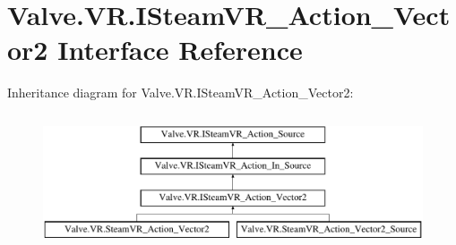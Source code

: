 \hypertarget{interface_valve_1_1_v_r_1_1_i_steam_v_r___action___vector2}{}\section{Valve.\+V\+R.\+I\+Steam\+V\+R\+\_\+\+Action\+\_\+\+Vector2 Interface Reference}
\label{interface_valve_1_1_v_r_1_1_i_steam_v_r___action___vector2}
Inheritance diagram for Valve.\+V\+R.\+I\+Steam\+V\+R\+\_\+\+Action\+\_\+\+Vector2\+:\begin{figure}[H]
\begin{center}
\leavevmode
\includegraphics[height=4.000000cm]{interface_valve_1_1_v_r_1_1_i_steam_v_r___action___vector2}
\end{center}
\end{figure}

